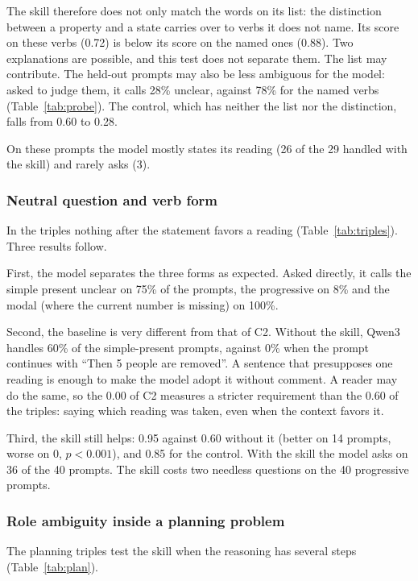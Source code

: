 \documentclass[11pt,a4paper]{article}
\begin{document}
The skill therefore does not only match the words on its list: the
distinction between a property and a state carries over to verbs it does
not name. Its score on these verbs (0.72) is below its score on the named
ones (0.88). Two explanations are possible, and this test does not
separate them. The list may contribute. The held-out prompts may also be
less ambiguous for the model: asked to judge them, it calls 28\% unclear,
against 78\% for the named verbs (Table~\ref{tab:probe}). The control,
which has neither the list nor the distinction, falls from 0.60 to
0.28.

On these prompts the model mostly states its reading (26 of the 29 handled
with the skill) and rarely asks (3).

\subsubsection{Neutral question and verb form}
\label{sec:triples}

In the triples nothing after the statement favors a reading
(Table~\ref{tab:triples}). Three results follow.

First, the model separates the three forms as expected. Asked directly, it
calls the simple present unclear on 75\% of the prompts, the progressive
on 8\% and the modal (where the current number is missing) on 100\%.

Second, the baseline is very different from that of C2. Without the skill,
Qwen3 handles 60\% of the simple-present prompts, against 0\% when the
prompt continues with ``Then 5 people are removed''. A sentence that
presupposes one reading is enough to make the model adopt it without
comment. A reader may do the same, so the 0.00 of C2 measures a stricter
requirement than the 0.60 of the triples: saying which reading was taken,
even when the context favors it.

Third, the skill still helps: 0.95 against 0.60 without it (better on 14
prompts, worse on 0, $p<0.001$), and 0.85 for the control. With the skill
the model asks on 36 of the 40 prompts. The skill costs two needless
questions on the 40 progressive prompts.

\subsubsection{Role ambiguity inside a planning problem}
\label{sec:plan}

The planning triples test the skill when the reasoning has several steps
(Table~\ref{tab:plan}).
\end{document}
